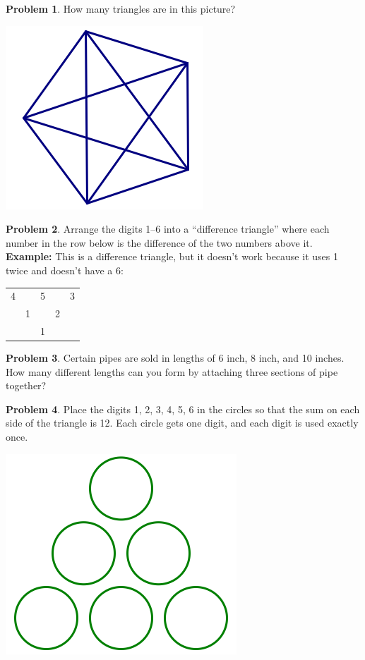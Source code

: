 \documentclass[10pt, reqno]{amsart}
\theoremstyle{remark}
\theoremstyle{definition}
\newtheorem{problem}{Problem}
\numberwithin{equation}{section}  %
\begin{document}
\begin{problem}
How many triangles are in this picture?
\begin{center}
\includegraphics[height=3 cm]{pent_tris}
\end{center}


\end{problem}

\begin{problem}
Arrange the digits 1--6 into a ``difference triangle'' where each number in the row below is the difference of the two numbers above it.\\
{\bf Example:} This is a difference triangle, but it doesn't work because it uses 1 twice and doesn't have a 6:

\begin{center}
\begin{tabular}{c c c c c}
4 && 5 && 3 \\
 & 1 && 2\\
 &&1 \\
 \end{tabular}
 \end{center}
\end{problem}


\begin{problem}
Certain pipes are sold in lengths of 6 inch, 8 inch, and 10 inches.  How many different lengths can you form by attaching three sections of pipe together?
\end{problem}

\begin{problem}
Place the digits 1, 2, 3, 4, 5, 6 in the circles so that the sum on each side of the triangle is 12.  Each circle gets one digit, and each digit is used exactly once.
\begin{center}
\includegraphics[height=3 cm]{circle_pyr}
\end{center}

\end{problem}
\end{document}
